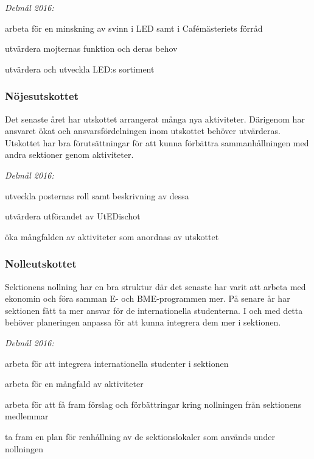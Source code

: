 \documentclass[../_main/handlingar.tex]{subfiles}
\begin{document}
\emph{Delmål 2016:}
\begin{dashlist}
    \item arbeta för en minskning av svinn i LED samt i Cafémästeriets förråd
    \item utvärdera mojternas funktion och deras behov
    \item utvärdera och utveckla LED:s sortiment
\end{dashlist}

\subsubsection*{Nöjesutskottet}
Det senaste året har utskottet arrangerat många nya aktiviteter. Därigenom har ansvaret ökat och ansvarsfördelningen inom utskottet behöver utvärderas. Utskottet har bra förutsättningar för att kunna förbättra sammanhållningen med andra sektioner genom aktiviteter.

\emph{Delmål 2016:}
\begin{dashlist}
    \item utveckla posternas roll samt beskrivning av dessa
    \item utvärdera utförandet av UtEDischot
    \item öka mångfalden av aktiviteter som anordnas av utskottet
\end{dashlist}

\subsubsection*{Nolleutskottet}
Sektionens nollning har en bra struktur där det senaste har varit att arbeta med ekonomin och föra samman E- och BME-programmen mer. På senare år har sektionen fått ta mer ansvar för de internationella studenterna. I och med detta behöver planeringen anpassa för att kunna integrera dem mer i sektionen.

\emph{Delmål 2016:}
\begin{dashlist}
    \item arbeta för att integrera internationella studenter i sektionen
    \item arbeta för en mångfald av aktiviteter
    \item arbeta för att få fram förslag och förbättringar kring nollningen från sektionens medlemmar
    \item ta fram en plan för renhållning av de sektionslokaler som används under nollningen
\end{dashlist}
\end{document}
